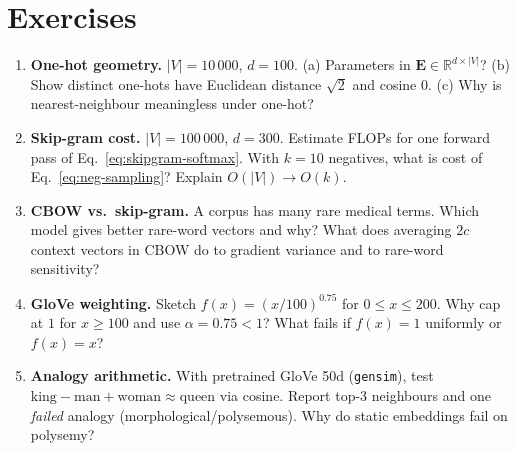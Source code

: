 \section{Exercises}
\label{sec:ch02-exercises}
\begin{enumerate}[label=E2.\arabic*, leftmargin=*, itemsep=0.7em]
    \item \textbf{One-hot geometry.} $|V|=10\,000$, $d=100$. (a) Parameters in
    $\mathbf{E}\in\mathbb{R}^{d\times|V|}$? (b) Show distinct one-hots have
    Euclidean distance $\sqrt2$ and cosine $0$. (c) Why is nearest-neighbour
    meaningless under one-hot?
    \item \textbf{Skip-gram cost.} $|V|=100\,000$, $d=300$. Estimate FLOPs for
    one forward pass of Eq.~\eqref{eq:skipgram-softmax}. With $k=10$ negatives,
    what is cost of Eq.~\eqref{eq:neg-sampling}? Explain $O(|V|)\to O(k)$.
    \item \textbf{CBOW vs.\ skip-gram.} A corpus has many rare medical terms.
    Which model gives better rare-word vectors and why? What does averaging
    $2c$ context vectors in CBOW do to gradient variance and to rare-word
    sensitivity?
    \item \textbf{GloVe weighting.} Sketch $f(x)=(x/100)^{0.75}$ for
    $0\le x\le200$. Why cap at $1$ for $x\ge100$ and use $\alpha=0.75<1$?
    What fails if $f(x)=1$ uniformly or $f(x)=x$?
    \item \textbf{Analogy arithmetic.} With pretrained GloVe 50d
    (\texttt{gensim}), test $\text{king}-\text{man}+\text{woman}\approx\text{queen}$
    via cosine. Report top-3 neighbours and one \emph{failed} analogy
    (morphological/polysemous). Why do static embeddings fail on polysemy?
\end{enumerate}

